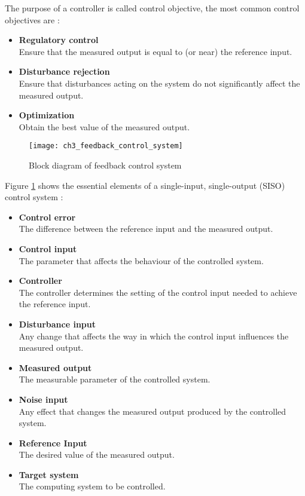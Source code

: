 The purpose of a controller is called control objective, the most common control objectives are \citep{Abdelzaher:2008ub}:
\begin{itemize}
	\item \textbf{Regulatory control}\\
	Ensure that the measured output is equal to (or near) the reference input.
	\item \textbf{Disturbance rejection}\\
	Ensure that disturbances acting on the system do not significantly affect the measured output.
	\item \textbf{Optimization}\\
	Obtain the best value of the measured output.
\end{itemize}

\begin{figure}[htbp]
	\centering
	\texttt{[image: ch3\_feedback\_control\_system]}
	\caption{Block diagram of feedback control system \citep{Hellerstein:2004a}}
	\label{fig:ch03_feedback_control_system}
\end{figure}

Figure \ref{fig:ch03_feedback_control_system} shows the essential elements of a single-input, single-output (SISO) control system \citep{Hellerstein:2004a}:
\begin{itemize}
	\item \textbf{Control error}\\
	The difference between the reference input and the measured output.
	\item \textbf{Control input}\\
	The parameter that affects the behaviour of the controlled system.
	\item \textbf{Controller}\\
	The controller determines the setting of the control input needed to achieve the reference input.
	\item \textbf{Disturbance input}\\
	Any change that affects the way in which the control input influences the measured output.
	\item \textbf{Measured output}\\
	The measurable parameter of the controlled system.
	\item \textbf{Noise input}\\
	Any effect that changes the measured output produced by the controlled system.
	\item \textbf{Reference Input}\\
	The desired value of the measured output.
	\item \textbf{Target system}\\
	The computing system to be controlled.
\end{itemize}

